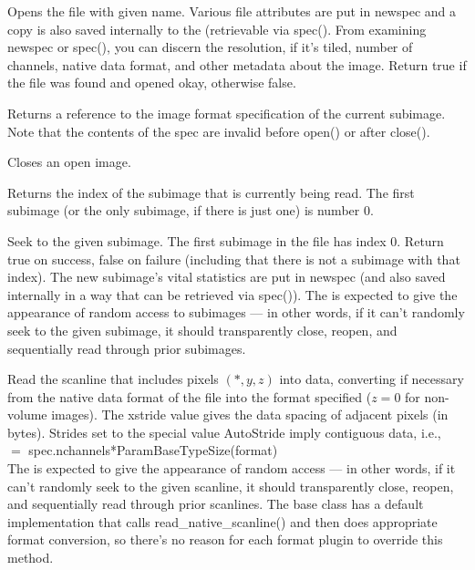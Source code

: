 Opens the file with given name.  Various file attributes are put in
{\kw newspec} and a copy is also saved internally to the
\ImageInput (retrievable via {\kw spec()}.  From examining
{\kw newspec} or {\kw spec()}, you can discern the resolution, if it's
tiled, number of channels, native data format, and other metadata about
the image.  Return {\kw true} if the file was found and opened okay,
otherwise {\kw false}.
\apiend

Returns a reference to the image format specification of the
current subimage.  Note that the contents of the spec are
invalid before {\kw open()} or after {\kw close()}.
\apiend

Closes an open image.
\apiend


Returns the index of the subimage that is currently being read.
The first subimage (or the only subimage, if there is just one) is
number 0.
\apiend


Seek to the given subimage.  The first subimage in the file has index 0.
Return {\kw true} on success, {\kw false} on failure (including that
there is not a subimage with that index).  The new subimage's vital
statistics are put in {\kw newspec} (and also saved internally in a way
that can be retrieved via {\kw spec()}).  The \ImageInput is
expected to give the appearance of random access to subimages --- in
other words, if it can't randomly seek to the given subimage, it should
transparently close, reopen, and sequentially read through prior
subimages.
\apiend


Read the scanline that includes pixels $(*,y,z)$ into {\kw data},
converting if necessary from the native data format of the file into the
{\kw format} specified ($z=0$ for non-volume images).  The {\kw xstride}
value gives the data spacing of adjacent pixels (in bytes).  Strides set
to the special value {\kw AutoStride} imply contiguous data, i.e., \\
   $=$ {\kw spec.nchannels*ParamBaseTypeSize(format)} \\
The \ImageInput is expected to give the appearance of random access
--- in other words, if it can't randomly seek to the given scanline, it
should transparently close, reopen, and sequentially read through prior
scanlines.  The base \ImageInput class has a default implementation
that calls {\kw read_native_scanline()} and then does appropriate format
conversion, so there's no reason for each format plugin to override this
method.
\apiend

